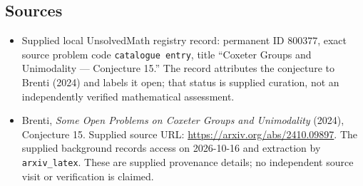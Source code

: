 \documentclass[11pt]{article}
\begin{document}
\subsection{Sources}
\begin{itemize}
\item Supplied local UnsolvedMath registry record: permanent ID \(800377\), exact source problem code \texttt{catalogue entry}, title ``Coxeter Groups and Unimodality --- Conjecture 15.'' The record attributes the conjecture to Brenti (2024) and labels it open; that status is supplied curation, not an independently verified mathematical assessment.
\item Brenti, \emph{Some Open Problems on Coxeter Groups and Unimodality} (2024), Conjecture 15. Supplied source URL: \url{https://arxiv.org/abs/2410.09897}. The supplied background records access on 2026-10-16 and extraction by \texttt{arxiv\_latex}. These are supplied provenance details; no independent source visit or verification is claimed.
\end{itemize}
\end{document}

